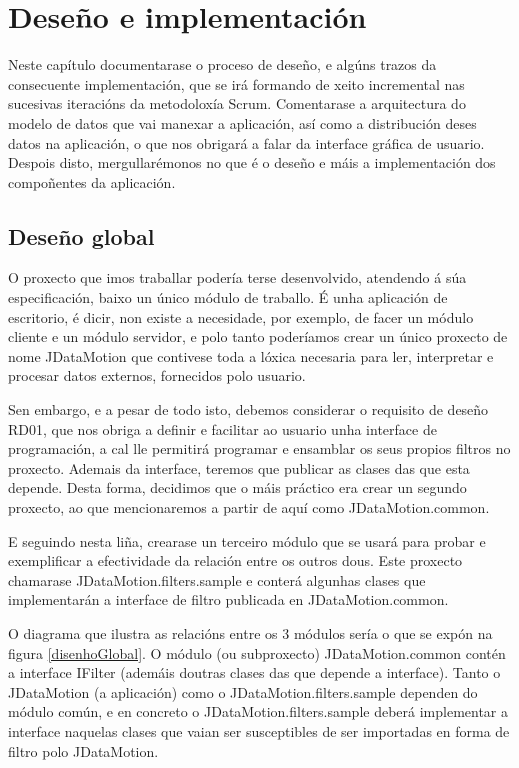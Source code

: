 \chapter{Deseño e implementación}

Neste capítulo documentarase o proceso de deseño, e algúns trazos da consecuente implementación, que se irá formando de xeito incremental nas sucesivas iteracións da metodoloxía Scrum. Comentarase a arquitectura do modelo de datos que vai manexar a aplicación, así como a distribución deses datos na aplicación, o que nos obrigará a falar da interface gráfica de usuario. Despois disto, mergullarémonos no que é o deseño e máis a implementación dos compoñentes da aplicación.

\section{Deseño global}

O proxecto que imos traballar podería terse desenvolvido, atendendo á súa especificación, baixo un único módulo de traballo. É unha aplicación de escritorio, é dicir, non existe a necesidade, por exemplo, de facer un módulo cliente e un módulo servidor, e polo tanto poderíamos crear un único proxecto de nome JDataMotion que contivese toda a lóxica necesaria para ler, interpretar e procesar datos externos, fornecidos polo usuario.

Sen embargo, e a pesar de todo isto, debemos considerar o requisito de deseño RD01, que nos obriga a definir e facilitar ao usuario unha interface de programación, a cal lle permitirá programar e ensamblar os seus propios filtros no proxecto. Ademais da interface, teremos que publicar as clases das que esta depende. Desta forma, decidimos que o máis práctico era crear un segundo proxecto, ao que mencionaremos a partir de aquí como JDataMotion.common.

E seguindo nesta liña, crearase un terceiro módulo que se usará para probar e exemplificar a efectividade da relación entre os outros dous. Este proxecto chamarase JDataMotion.filters.sample e conterá algunhas clases que implementarán a interface de filtro publicada en JDataMotion.common.

O diagrama que ilustra as relacións entre os 3 módulos sería o que se expón na figura \ref{disenhoGlobal}. O módulo (ou subproxecto) JDataMotion.common contén a interface IFilter (ademáis doutras clases das que depende a interface). Tanto o JDataMotion (a aplicación) como o JDataMotion.filters.sample dependen do módulo común, e en concreto o JDataMotion.filters.sample deberá implementar a interface naquelas clases que vaian ser susceptibles de ser importadas en forma de filtro polo JDataMotion.

